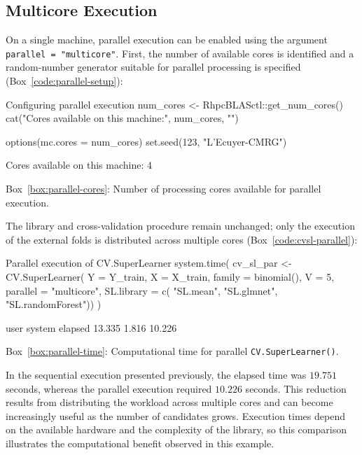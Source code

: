 \documentclass[12pt]{article}
\newcommand{\routputcaption}[2]{%
    \par\smallskip
    \begin{center}
        Box~\ref{#1}: #2
    \end{center}
}
\begin{document}
\subsection{Multicore Execution}

On a single machine, parallel execution can be enabled using the argument \texttt{parallel = "multicore"}. First, the number of available cores is identified and a random-number generator suitable for parallel processing is specified (Box~\ref{code:parallel-setup}):

\begin{rcode}[label={code:parallel-setup}]{Configuring parallel execution}
	num_cores <- RhpcBLASctl::get_num_cores()
	cat("Cores available on this machine:", num_cores, "\n")
	
	options(mc.cores = num_cores)
	set.seed(123, "L'Ecuyer-CMRG")
\end{rcode}

\begin{routputref}[label={box:parallel-cores}]
	Cores available on this machine: 4
\end{routputref}

\routputcaption{box:parallel-cores}
{Number of processing cores available for parallel execution.}

The library and cross-validation procedure remain unchanged; only the execution of the external folds is distributed across multiple cores (Box~\ref{code:cvsl-parallel}):

\begin{rcode}[label={code:cvsl-parallel}]{Parallel execution of CV.SuperLearner}
	system.time({
		cv_sl_par <- CV.SuperLearner(
		Y = Y_train, X = X_train,
		family = binomial(),
		V = 5,
		parallel = "multicore",
		SL.library = c(
		"SL.mean",
		"SL.glmnet",
		"SL.randomForest"))
	})
\end{rcode}

\begin{routputref}[label={box:parallel-time}]
	user  system elapsed
	13.335   1.816  10.226
\end{routputref}

\routputcaption{box:parallel-time}
{Computational time for parallel \texttt{CV.SuperLearner()}.}

In the sequential execution presented previously, the elapsed time was $19.751$ seconds, whereas the parallel execution required $10.226$ seconds. This reduction results from distributing the workload across multiple cores and can become increasingly useful as the number of candidates grows. Execution times depend on the available hardware and the complexity of the library, so this comparison illustrates the computational benefit observed in this example.
\end{document}
